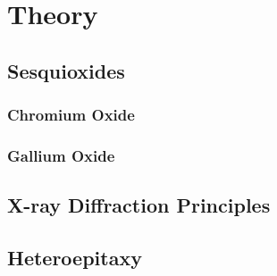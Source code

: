 \chapter{Theory}
\minitoc

\section{Sesquioxides}
    
    \subsection{Chromium Oxide}\label{Sec:Cr2O3}
        
    \subsection{Gallium Oxide}
        

\section{X-ray Diffraction Principles}
    
        \label{Sec:Theory_X-ray_diffraction}

\section{Heteroepitaxy}
    